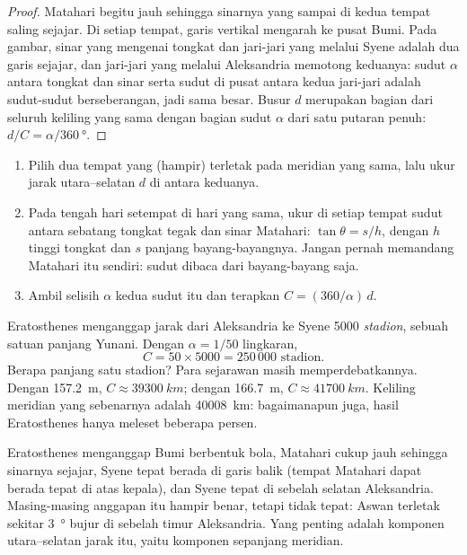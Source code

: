 \begin{proof}
Matahari begitu jauh sehingga sinarnya yang sampai di kedua tempat saling
sejajar. Di setiap tempat, garis vertikal mengarah ke pusat Bumi. Pada gambar,
sinar yang mengenai tongkat dan jari-jari yang melalui Syene adalah dua garis
sejajar, dan jari-jari yang melalui Aleksandria memotong keduanya: sudut
$\alpha$ antara tongkat dan sinar serta sudut di pusat antara kedua jari-jari
adalah sudut-sudut berseberangan, jadi sama besar. Busur $d$ merupakan bagian
dari seluruh keliling yang sama dengan bagian sudut $\alpha$ dari satu putaran
penuh: $d/C = \alpha/\qty{360}{\degree}$.
\end{proof}

\begin{method}\label{met:g10:measuring-the-earth:shadows}
\begin{enumerate}
  \item Pilih dua tempat yang (hampir) terletak pada meridian yang sama, lalu
        ukur jarak utara--selatan $d$ di antara keduanya.
  \item Pada tengah hari setempat di hari yang sama, ukur di setiap tempat
        sudut antara sebatang tongkat tegak dan sinar Matahari:
        $\tan \theta = s/h$, dengan $h$ tinggi tongkat dan $s$ panjang
        bayang-bayangnya. Jangan pernah memandang Matahari itu sendiri: sudut
        dibaca dari bayang-bayang saja.
  \item Ambil selisih $\alpha$ kedua sudut itu dan terapkan
        $C = (360/\alpha)\,d$.
\end{enumerate}
\end{method}

\begin{example}\label{ex:g10:measuring-the-earth:numbers}
Eratosthenes menganggap jarak dari Aleksandria ke Syene 5000
\emph{stadion}, sebuah satuan panjang Yunani. Dengan $\alpha = 1/50$ lingkaran,
\[
  C = 50 \times 5000 = 250\,000 \text{ stadion}.
\]
Berapa panjang satu stadion? Para sejarawan masih memperdebatkannya. Dengan
\qty{157.2}{m}, $C \approx \qty{39300}{km}$; dengan \qty{166.7}{m},
$C \approx \qty{41700}{km}$. Keliling meridian yang sebenarnya adalah
\qty{40008}{km}: bagaimanapun juga, hasil Eratosthenes hanya meleset beberapa
persen.
\end{example}

\begin{remark}\label{rem:g10:measuring-the-earth:assumptions}
Eratosthenes menganggap Bumi berbentuk bola, Matahari cukup jauh sehingga
sinarnya sejajar, Syene tepat berada di garis balik (tempat Matahari dapat
berada tepat di atas kepala), dan Syene tepat di sebelah selatan Aleksandria.
Masing-masing anggapan itu hampir benar, tetapi tidak tepat: Aswan terletak
sekitar \qty{3}{\degree} bujur di sebelah timur Aleksandria. Yang penting
adalah komponen utara--selatan jarak itu, yaitu komponen sepanjang meridian.
\end{remark}

